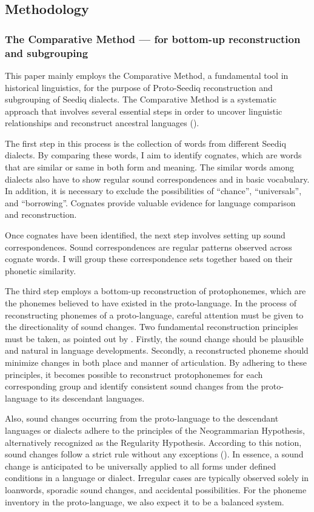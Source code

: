 \documentclass[12pt]{article}
\begin{document}
\subsection{Methodology}

\subsubsection{The Comparative Method --- for bottom-up reconstruction and subgrouping}

This paper mainly employs the Comparative Method, a fundamental tool in historical linguistics, for the purpose of Proto-Seediq reconstruction and subgrouping of Seediq dialects. The Comparative Method is a systematic approach that involves several essential steps in order to uncover linguistic relationships and reconstruct ancestral languages (\cite{fox1995linguistic}).

The first step in this process is the collection of words from different Seediq dialects. By comparing these words, I aim to identify cognates, which are words that are similar or same in both form and meaning. The similar words among dialects also have to show regular sound correspondences and in basic vocabulary. In addition, it is necessary to exclude the possibilities of ``chance'', ``universals'', and ``borrowing''. Cognates provide valuable evidence for language comparison and reconstruction.

Once cognates have been identified, the next step involves setting up sound correspondences. Sound correspondences are regular patterns observed across cognate words. I will group these correspondence sets together based on their phonetic similarity. 

The third step employs a bottom-up reconstruction of protophonemes, which are the phonemes believed to have existed in the proto-language. In the process of reconstructing phonemes of a proto-language, careful attention must be given to the directionality of sound changes. Two fundamental reconstruction principles must be taken, as pointed out by \textcite[85]{crowley2010introduction}. Firstly, the sound change should be plausible and natural in language developments. Secondly, a reconstructed phoneme should minimize changes in both place and manner of articulation. By adhering to these principles, it becomes possible to reconstruct protophonemes for each corresponding group and identify consistent sound changes from the proto-language to its descendant languages.

Also, sound changes occurring from the proto-language to the descendant languages or dialects adhere to the principles of the Neogrammarian Hypothesis, alternatively recognized as the Regularity Hypothesis. According to this notion, sound changes follow a strict rule without any exceptions (\cite{brugmann1878morphologische}). In essence, a sound change is anticipated to be universally applied to all forms under defined conditions in a language or dialect. Irregular cases are typically observed solely in loanwords, sporadic sound changes, and accidental possibilities. For the phoneme inventory in the proto-language, we also expect it to be a balanced system. 
\end{document}
